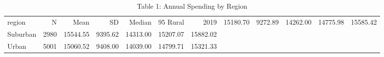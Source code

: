 \begin{table}[ht]
\centering
\begin{tabular}{lrrrrrr}
  \hline
region & N & Mean & SD & Median & 95%
  \hline
Rural & 2019 & 15180.70 & 9272.89 & 14262.00 & 14775.98 & 15585.42 \\ 
  Suburban & 2980 & 15544.55 & 9395.62 & 14313.00 & 15207.07 & 15882.02 \\ 
  Urban & 5001 & 15060.52 & 9408.00 & 14039.00 & 14799.71 & 15321.33 \\ 
   \hline
\end{tabular}
\caption{Table 1: Annual Spending by Region} 
\label{tab:spending_region}
\end{table}

